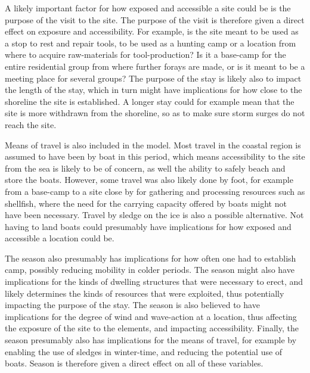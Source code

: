 \documentclass[
  a4paper,
  oneside]{uiophdthesis}
\begin{document}
A likely important factor for how exposed and accessible a site could be is the purpose of the visit to the site. The purpose of the visit is therefore given a direct effect on exposure and accessibility. For example, is the site meant to be used as a stop to rest and repair tools, to be used as a hunting camp or a location from where to acquire raw-materials for tool-production? Is it a base-camp for the entire residential group from where further forays are made, or is it meant to be a meeting place for several groups? The purpose of the stay is likely also to impact the length of the stay, which in turn might have implications for how close to the shoreline the site is established. A longer stay could for example mean that the site is more withdrawn from the shoreline, so as to make sure storm surges do not reach the site.

Means of travel is also included in the model. Most travel in the coastal region is assumed to have been by boat in this period, which means accessibility to the site from the sea is likely to be of concern, as well the ability to safely beach and store the boats. However, some travel was also likely done by foot, for example from a base-camp to a site close by for gathering and processing resources such as shellfish, where the need for the carrying capacity offered by boats might not have been necessary. Travel by sledge on the ice is also a possible alternative. Not having to land boats could presumably have implications for how exposed and accessible a location could be.

The season also presumably has implications for how often one had to establish camp, possibly reducing mobility in colder periods. The season might also have implications for the kinds of dwelling structures that were necessary to erect, and likely determines the kinds of resources that were exploited, thus potentially impacting the purpose of the stay. The season is also believed to have implications for the degree of wind and wave-action at a location, thus affecting the exposure of the site to the elements, and impacting accessibility. Finally, the season presumably also has implications for the means of travel, for example by enabling the use of sledges in winter-time, and reducing the potential use of boats. Season is therefore given a direct effect on all of these variables.
\end{document}
